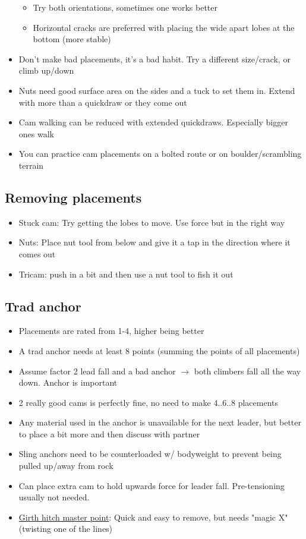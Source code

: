\begin{itemize}
\begin{itemize}
	\item Try both orientations, sometimes one works better
	\item Horizontal cracks are preferred with placing the wide apart lobes at the bottom (more stable)
	\end{itemize}
\item Don't make bad placements, it's a bad habit. Try a different size/crack, or climb up/down
\item Nuts need good surface area on the sides and a tuck to set them in. Extend with more than a quickdraw or they come out
\item Cam walking can be reduced with extended quickdraws. Especially bigger ones walk
\item You can practice cam placements on a bolted route or on boulder/scrambling terrain
\end{itemize}

\subsection{Removing placements}
\begin{itemize}
\item Stuck cam: Try getting the lobes to move. Use force but in the right way
\item Nuts: Place nut tool from below and give it a tap in the direction where it comes out
\item Tricam: push in a bit and then use a nut tool to fish it out
\end{itemize}

\subsection{Trad anchor}
\begin{itemize}
\item Placements are rated from 1-4, higher being better
\item A trad anchor needs at least 8 points (summing the points of all placements)
\item Assume factor 2 lead fall and a bad anchor $\rightarrow$ both climbers fall all the way down. Anchor is important
\item 2 really good cams is perfectly fine, no need to make 4..6..8 placements
\item Any material used in the anchor is unavailable for the next leader, but better to place a bit more and then discuss with partner
\item Sling anchors need to be counterloaded w/ bodyweight to prevent being pulled up/away from rock
\item Can place extra cam to hold upwards force for leader fall. Pre-tensioning usually not needed.
\item \href{https://www.alpinesavvy.com/blog/try-a-girth-hitch-at-the-master-point}{Girth hitch master point}: Quick and easy to remove, but needs "magic X" (twisting one of the lines)
\end{itemize}



